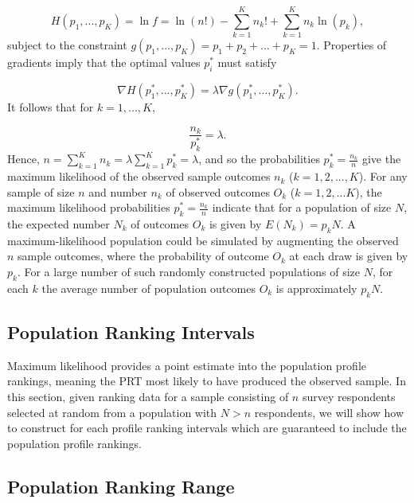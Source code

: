 \documentclass[a4paper, 12pt]{article}
\begin{document}
\begin{equation}
H(p_1, ..., p_K)=\ln f = \ln(n!) - \sum_{k=1}^{K} n_k! +\sum_{k=1}^{K} n_k\ln(p_k),
\end{equation}
\label{eq:5}
{\flushleft subject} to the constraint $g(p_1, ..., p_{K})=p_1+p_2+...+p_K=1$.  Properties of gradients imply that the optimal values $p_i^*$ must satisfy

\begin{equation}
\nabla H(p_1^*, ..., p_K^*) = \lambda \nabla g(p_1^*, ..., p_{K}^*).
\end{equation}
\label{eq:6}
{\flushleft It} follows that for $k=1, ..., K$,

\begin{equation}
\frac{n_k}{p_k^*}=\lambda.
\end{equation}
\label{eq:7}
{\flushleft Hence,} $n=\sum_{k=1}^{K} n_k =  \lambda \sum_{k=1}^{K} p_k^* = \lambda$, and so the probabilities $p_k^* = \frac{n_k}{n}$ give the maximum likelihood of the observed sample outcomes $n_k$ ($k=1, 2, ..., K$).  For any sample of size $n$ and number $n_k$ of observed outcomes $O_k$ ($k=1, 2, ...K$), the maximum likelihood probabilities $p_k^*=\frac{n_k}{n}$
indicate that for a population of size $N$, the expected number $N_k$ of outcomes $O_k$ is given by $E(N_k)=p_k N.$  A maximum-likelihood population could be simulated by augmenting the observed $n$ sample outcomes, where the probability of outcome $O_k$ at each draw is given by $p_k$.   For a large number of such randomly constructed populations of size $N$, for each $k$ the average number of population outcomes $O_k$ is approximately $p_k N$.






\subsection{Population Ranking Intervals}

Maximum likelihood  provides a point estimate into the population profile rankings, meaning the PRT most likely to have produced the observed sample. In this section, given ranking data for a sample consisting of $n$ survey respondents selected at random from a population with $N> n$ respondents, we will show how to construct for each profile ranking intervals   which are guaranteed to include the population profile rankings.

\subsection{Population Ranking Range}
\end{document}
